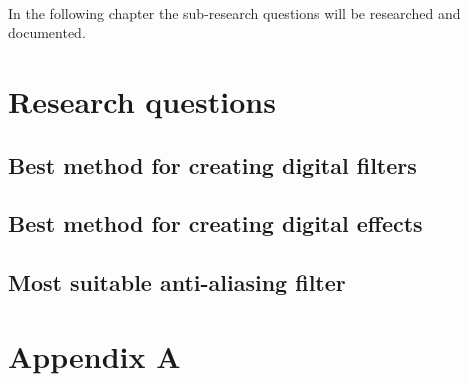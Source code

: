 \documentclass[11pt, a4paper]{report}
\begin{document}
\begin{justify}
\noindent \\In the following chapter the sub-research questions will be researched and documented.

\chapter{Research questions}

	\section{Best method for creating digital filters}	
	\section{Best method for creating digital effects}
	
	\section{Most suitable anti-aliasing filter}
	
	\section{}

\printbibliography[
	heading=bibintoc,
	title={Bibliography}
]

\appendix

\chapter{Appendix A}

\end{justify}
\end{document}
